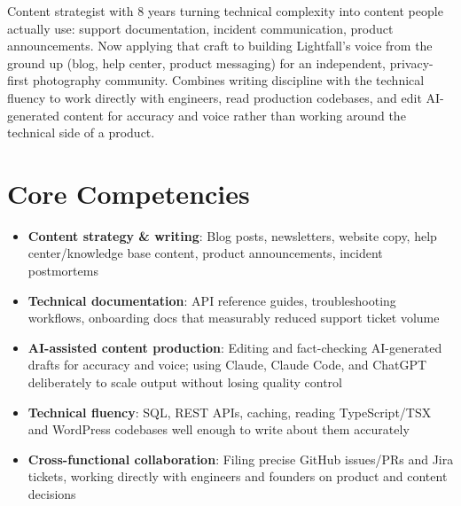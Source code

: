 \documentclass[11pt,a4paper,sans]{moderncv}
\begin{document}
\makecvtitle


\vspace{6pt}
\small{Content strategist with 8 years turning technical complexity into content people actually use: support documentation, incident communication, product announcements. Now applying that craft to building Lightfall's voice from the ground up (blog, help center, product messaging) for an independent, privacy-first photography community. Combines writing discipline with the technical fluency to work directly with engineers, read production codebases, and edit AI-generated content for accuracy and voice rather than working around the technical side of a product.}


\section{Core Competencies}
\vspace{1pt}
\begin{itemize}

\item \textbf{Content strategy \& writing}: Blog posts, newsletters, website copy, help center/knowledge base content, product announcements, incident postmortems

\item \textbf{Technical documentation}: API reference guides, troubleshooting workflows, onboarding docs that measurably reduced support ticket volume

\item \textbf{AI-assisted content production}: Editing and fact-checking AI-generated drafts for accuracy and voice; using Claude, Claude Code, and ChatGPT deliberately to scale output without losing quality control

\item \textbf{Technical fluency}: SQL, REST APIs, caching, reading TypeScript/TSX and WordPress codebases well enough to write about them accurately

\item \textbf{Cross-functional collaboration}: Filing precise GitHub issues/PRs and Jira tickets, working directly with engineers and founders on product and content decisions

\end{itemize}
\end{document}
